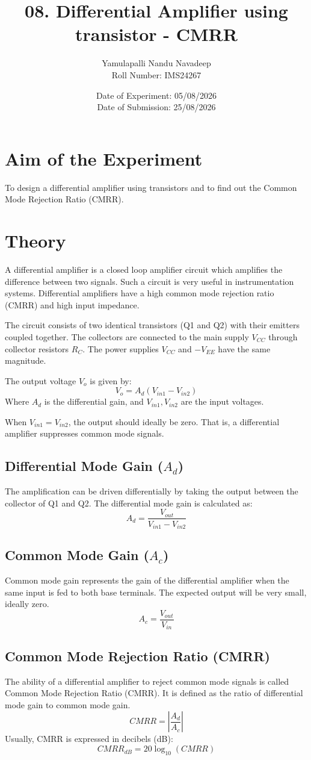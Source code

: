 \documentclass[12pt,a4paper]{article}
\title{\textbf{08. Differential Amplifier using transistor - CMRR}}
\author{Yamulapalli Nandu Navadeep \\ Roll Number: IMS24267}
\date{Date of Experiment: 05/08/2026 \\ Date of Submission: 25/08/2026}
\begin{document}
\maketitle

\section{Aim of the Experiment}
To design a differential amplifier using transistors and to find out the Common Mode Rejection Ratio (CMRR).

\section{Theory}
A differential amplifier is a closed loop amplifier circuit which amplifies the difference between two signals. Such a circuit is very useful in instrumentation systems. Differential amplifiers have a high common mode rejection ratio (CMRR) and high input impedance.

The circuit consists of two identical transistors (Q1 and Q2) with their emitters coupled together. The collectors are connected to the main supply $V_{CC}$ through collector resistors $R_C$. The power supplies $V_{CC}$ and $-V_{EE}$ have the same magnitude.

The output voltage $V_o$ is given by:
$$V_o = A_d(V_{in1} - V_{in2})$$
Where $A_d$ is the differential gain, and $V_{in1}, V_{in2}$ are the input voltages.

When $V_{in1} = V_{in2}$, the output should ideally be zero. That is, a differential amplifier suppresses common mode signals.

\subsection{Differential Mode Gain ($A_d$)}
The amplification can be driven differentially by taking the output between the collector of Q1 and Q2. The differential mode gain is calculated as:
$$A_d = \frac{V_{out}}{V_{in1} - V_{in2}}$$

\subsection{Common Mode Gain ($A_c$)}
Common mode gain represents the gain of the differential amplifier when the same input is fed to both base terminals. The expected output will be very small, ideally zero.
$$A_c = \frac{V_{out}}{V_{in}}$$

\subsection{Common Mode Rejection Ratio (CMRR)}
The ability of a differential amplifier to reject common mode signals is called Common Mode Rejection Ratio (CMRR). It is defined as the ratio of differential mode gain to common mode gain.
$$CMRR = \left| \frac{A_d}{A_c} \right|$$
Usually, CMRR is expressed in decibels (dB):
$$CMRR_{dB} = 20 \log_{10}(CMRR)$$
\end{document}
